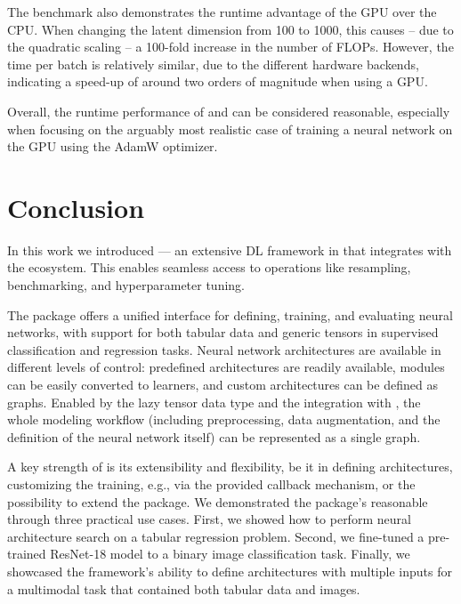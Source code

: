 \documentclass[article]{jss}
\theoremstyle{definition}
\begin{document}
The benchmark also demonstrates the runtime advantage of the GPU over the CPU.
When changing the latent dimension from 100 to 1000, this causes -- due to the quadratic scaling -- a 100-fold increase in the number of FLOPs.
However, the time per batch is relatively similar, due to the different hardware backends, indicating a speed-up of around two orders of magnitude when using a GPU.

Overall, the runtime performance of \mlrttorch{} and \torch{} can be considered reasonable, especially when focusing on the arguably most realistic case of training a neural network on the GPU using the AdamW optimizer.

\section{Conclusion}\label{sec:conclusion}

In this work we introduced  --- an extensive DL framework in \rlang{} that integrates with the \mlrt{} ecosystem.
This enables seamless access to operations like resampling, benchmarking, and hyperparameter tuning.

The package offers a unified interface for defining, training, and evaluating neural networks, with support for both tabular data and generic tensors in supervised classification and regression tasks.
Neural network architectures are available in different levels of control: predefined architectures are readily available, \torch{} modules can be easily converted to \mlrttorch{} learners, and custom architectures can be defined as graphs.
Enabled by the lazy tensor data type and the integration with \mlrtpipelines{}, the whole modeling workflow (including preprocessing, data augmentation, and the definition of the neural network itself) can be represented as a single graph.

A key strength of  is its extensibility and flexibility, be it in defining architectures, customizing the training, e.g., via the provided callback mechanism, or the possibility to extend the package.
We demonstrated the package's reasonable through three practical use cases. First, we showed how to perform neural architecture search on a tabular regression problem.
Second, we fine-tuned a pre-trained ResNet-18 model to a binary image classification task.
Finally, we showcased the framework's ability to define architectures with multiple inputs for a multimodal task that contained both tabular data and images.
\end{document}
